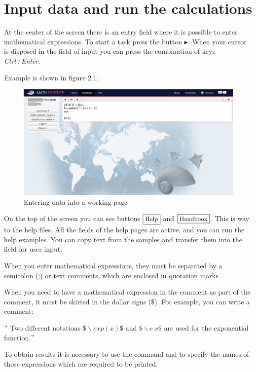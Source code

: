 \section{Input data and run the calculations}

At the center of the screen there is an entry field where it is possible to enter
 mathematical expressions.
 To start a task press the button $\blacktriangleright$.  When your cursor is disposed in the field of input you can press the combination  of keys {\it Ctrl+Enter}.


Example  is shown in figure 2.1.  
 
\begin{figure}
  \label{1_1}
  \includegraphics[scale=0.5]{pictures/1_1e}
  \caption{Entering data into a working page}
\end{figure}

On the top of the screen you can see buttons ${\small \fbox {Help}}$ and ${\small \fbox{Handbook}}$. 
This is way to the help files. All the fields of the help pages are active, and you can run the help examples. You can copy text from the samples and transfer them into the field for user input.

When you enter mathematical expressions, they must be separated by a semicolon (;) or text comments, which are enclosed in quotation marks.
 
When you need to have a mathematical expression in the comment as part of the comment, it must be skirted in the dollar signs ($\$$). For example, you can write a comment:

\noindent
$"$ Two different notations $\$ \backslash exp(x)\$$ and $\$\backslash e  \widehat{\ }{} x\$$  are used for the exponential function.$"$

To obtain results it is necessary to use the command  and to specify the names of those
 expressions which are required to be printed. 

